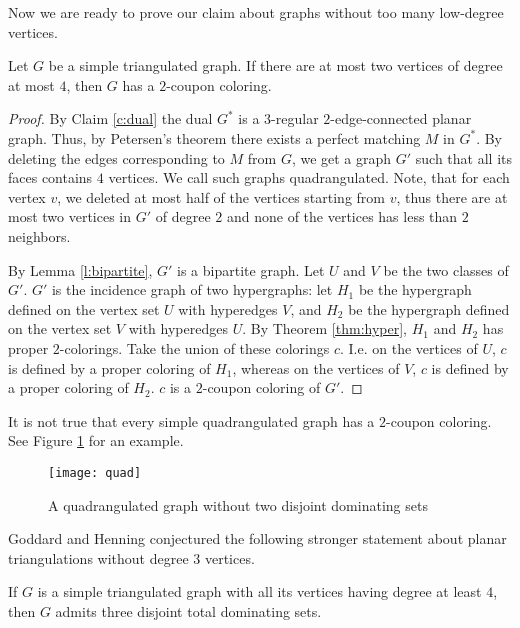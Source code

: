 Now we are ready to prove our claim about graphs without too many low-degree vertices.

\begin{claim}
  Let $G$ be a simple triangulated graph. If there are at most two vertices of degree
  at most $4$, then $G$ has a $2$-coupon coloring.
\end{claim}
\begin{proof}
  By Claim \ref{c:dual} the dual $G^*$ is a $3$-regular $2$-edge-connected planar graph.
  Thus, by Petersen's theorem there exists a perfect matching $M$ in $G^*$. By deleting
  the edges corresponding to $M$ from $G$, we get a graph $G'$ such that all its faces contains
  $4$ vertices. We call such graphs quadrangulated. Note, that for each vertex $v$,
  we deleted at most half of the vertices starting from $v$, thus there are at most
  two vertices in $G'$ of degree $2$ and none of the vertices has less than $2$ neighbors.

  By Lemma \ref{l:bipartite}, $G'$
  is a bipartite graph. Let $U$ and $V$ be the two classes of $G'$. $G'$ is the incidence
  graph of two hypergraphs: let $H_1$ be the hypergraph defined on the vertex set
  $U$ with hyperedges $V$, and $H_2$ be the hypergraph defined on the vertex set $V$
  with hyperedges $U$. By Theorem \ref{thm:hyper}, $H_1$ and $H_2$ has proper $2$-colorings.
  Take the union of these colorings $c$. I.e. on the vertices of $U$, $c$ is defined
  by a proper coloring of $H_1$, whereas on the vertices of $V$, $c$ is defined
  by a proper coloring of $H_2$. $c$ is a $2$-coupon coloring of $G'$.
\end{proof}

\begin{remark}
  It is not true that every simple quadrangulated graph has a $2$-coupon coloring.
  See Figure \ref{fig:quad} for an example.
\end{remark}
\begin{figure}[h]
  \centering
  \texttt{[image: quad]}
  \caption{A quadrangulated graph without two disjoint dominating sets}
  \label{fig:quad}
\end{figure}

Goddard and Henning \cite{gh} conjectured the following stronger statement about
planar triangulations without degree $3$ vertices.

\begin{conj}
  If $G$ is a simple triangulated graph with all its vertices having degree at least
  $4$, then $G$ admits three disjoint total dominating sets.
\end{conj}

